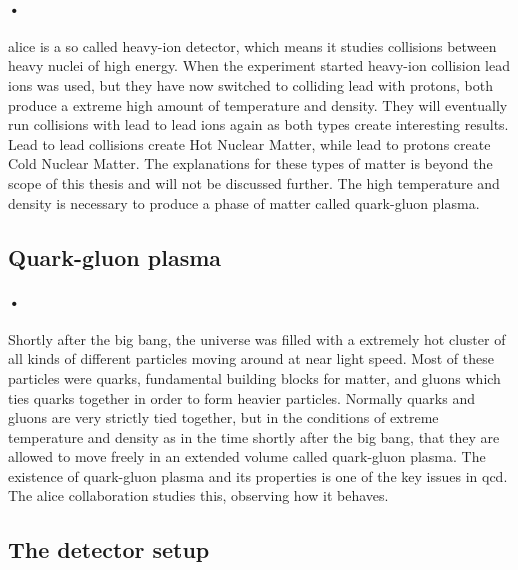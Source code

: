 \documentclass[a4paper]{report}
\begin{document}
\paragraph{•}
\gls{alice} is a so called heavy-ion detector, which means it studies collisions between heavy nuclei of high energy.\cite{alice-home}
When the experiment started heavy-ion collision lead ions was used, but they have now switched to colliding lead with protons, both produce a extreme high amount of temperature and density.
They will eventually run collisions with lead to lead ions again as both types create interesting results.
Lead to lead collisions create Hot Nuclear Matter, while lead to protons create Cold Nuclear Matter.
The explanations for these types of matter is beyond the scope of this thesis and will not be discussed further.
The high temperature and density is necessary to produce a phase of matter called quark-gluon plasma.

\subsection{Quark-gluon plasma}
\paragraph{•}
Shortly after the big bang, the universe was filled with a extremely hot cluster of all kinds of different particles moving around at near light speed.\cite{alice-physics}
Most of these particles were quarks, fundamental building blocks for matter, and gluons which ties quarks together in order to form heavier particles.
Normally quarks and gluons are very strictly tied together, but in the conditions of extreme temperature and density as in the time shortly after the big bang, that they are allowed to move freely in an extended volume called quark-gluon plasma.
The existence of quark-gluon plasma and its properties is one of the key issues in \gls{qcd}.
The \gls{alice} collaboration studies this, observing how it behaves.

\subsection{The detector setup}
\end{document}
